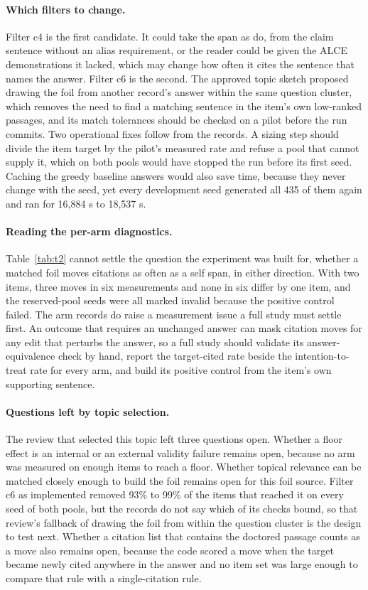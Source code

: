 \documentclass[11pt]{article}
\begin{document}
\paragraph{Which filters to change.} Filter c4 is the first candidate. It could take the span as \citet{khan2026attributable} do, from the claim sentence without an alias requirement, or the reader could be given the ALCE demonstrations it lacked, which may change how often it cites the sentence that names the answer. Filter c6 is the second. The approved topic sketch proposed drawing the foil from another record's answer within the same question cluster, which removes the need to find a matching sentence in the item's own low-ranked passages, and its match tolerances should be checked on a pilot before the run commits. Two operational fixes follow from the records. A sizing step should divide the item target by the pilot's measured rate and refuse a pool that cannot supply it, which on both pools would have stopped the run before its first seed. Caching the greedy baseline answers would also save time, because they never change with the seed, yet every development seed generated all 435 of them again and ran for 16,884 s to 18,537 s.

\paragraph{Reading the per-arm diagnostics.} Table~\ref{tab:t2} cannot settle the question the experiment was built for, whether a matched foil moves citations as often as a self span, in either direction. With two items, three moves in six measurements and none in six differ by one item, and the reserved-pool seeds were all marked invalid because the positive control failed. The arm records do raise a measurement issue a full study must settle first. An outcome that requires an unchanged answer can mask citation moves for any edit that perturbs the answer, so a full study should validate its answer-equivalence check by hand, report the target-cited rate beside the intention-to-treat rate for every arm, and build its positive control from the item's own supporting sentence.

\paragraph{Questions left by topic selection.} The review that selected this topic left three questions open. Whether a floor effect is an internal or an external validity failure remains open, because no arm was measured on enough items to reach a floor. Whether topical relevance can be matched closely enough to build the foil remains open for this foil source. Filter c6 as implemented removed 93\% to 99\% of the items that reached it on every seed of both pools, but the records do not say which of its checks bound, so that review's fallback of drawing the foil from within the question cluster is the design to test next. Whether a citation list that contains the doctored passage counts as a move also remains open, because the code scored a move when the target became newly cited anywhere in the answer and no item set was large enough to compare that rule with a single-citation rule.
\end{document}
